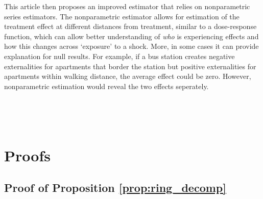 \documentclass[12pt]{article}
\begin{document}
This article then proposes an improved estimator that relies on nonparametric series estimators. The nonparametric estimator allows for estimation of the treatment effect at different distances from treatment, similar to a dose-response function, which can allow better understanding of \emph{who} is experiencing effects and how this changes across `exposure' to a shock. More, in some cases it can provide explanation for null results. For example, if a bus station creates negative externalities for apartments that border the station but positive externalities for apartments within walking distance, the average effect could be zero. However, nonparametric estimation would reveal the two effects seperately.


\newpage~

\newpage~\appendix 

\section{Proofs}
\label{sec:proofs}

\subsection{Proof of Proposition \ref{prop:ring_decomp}}
\end{document}
